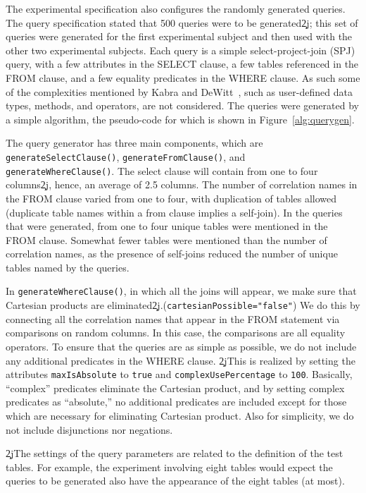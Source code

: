 {The experimental specification also configures the randomly generated
queries. The query specification stated that 500 queries were to be
generated\c2j{}{; this set of queries were generated for the first experimental
subject and then used with the other two experimental subjects}. Each query
is a simple select-project-join (SPJ) query, with a few attributes in the
SELECT clause, a few tables referenced in the FROM clause, and a few
equality predicates in the WHERE clause. As such some of the complexities
mentioned by Kabra and DeWitt~\cite{kabra98}, such as
user-defined data types, methods, and operators, are not considered.  The queries were generated
by a simple algorithm, the pseudo-code for which is shown in
Figure~\ref{alg:querygen}.

The query generator has three main components, which are {\tt
  generateSelectClause()}, {\tt generateFromClause()}, and {\tt
  generateWhereClause()}. The select clause will contain from one to four
columns\c2j{}{, hence, an average of 2.5 columns}. The number of correlation names
in the FROM clause varied from one to four, with duplication of tables
allowed (duplicate table names within a from clause implies a self-join).
In the queries that were generated, from one to four unique tables were
mentioned in the FROM clause. Somewhat fewer tables were mentioned than the
number of correlation names, as the presence of self-joins reduced the
number of unique tables named by the queries.

In {\tt generateWhereClause()}, in which all the joins will appear, we make
sure that Cartesian products are
eliminated\c2j{.}{(\verb.cartesianPossible="false".)}  We do this by
connecting all the correlation names that appear in the FROM statement via
comparisons on random columns. In this case, the comparisons are all
equality operators. To ensure that the queries are as simple as possible, we
do not include any additional predicates in the WHERE clause.  \c2j{}{This
  is realized by setting the attributes {\tt maxIsAbsolute} to {\tt true}
  and {\tt complexUsePercentage} to {\tt 100}.  Basically, ``complex''
  predicates eliminate the Cartesian product, and by setting complex
  predicates as ``absolute,'' no additional predicates are included except
  for those which are necessary for eliminating Cartesian product.} Also for
simplicity, we do not include disjunctions nor negations.

\c2j{}{The settings of the query parameters are related to the definition of the test
tables. For example, the experiment involving eight tables would expect the
queries to be generated also have the appearance of the eight tables (at most).
}
}

